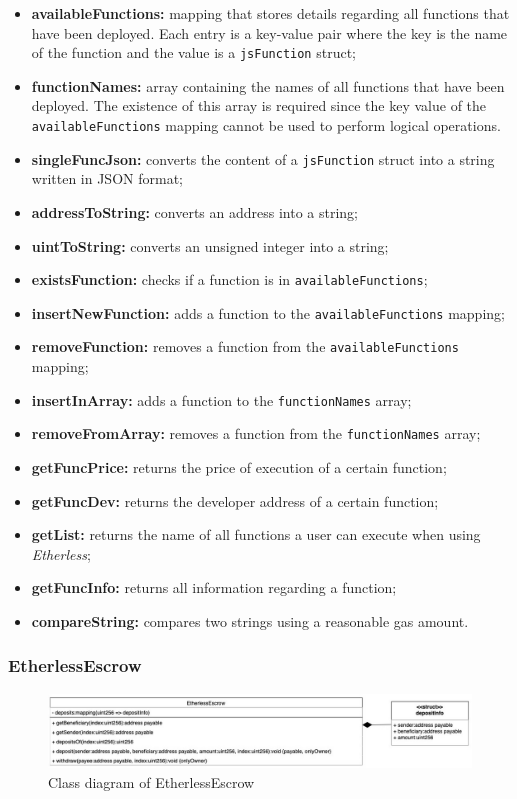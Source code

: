 	\begin{itemize}
		\item \textbf{availableFunctions:} mapping that stores details regarding all functions that have been deployed. Each entry is a key-value pair where the key is the name of the function and the value is a \texttt{jsFunction} struct;
		\item \textbf{functionNames:} array containing the names of all functions that have been deployed. The existence of this array is required since the key value of the \texttt{availableFunctions} mapping cannot be used to perform logical operations.
	\end{itemize}
	\begin{itemize}
		\item \textbf{singleFuncJson:} converts the content of a \texttt{jsFunction} struct into a string written in JSON format;
		\item \textbf{addressToString:} converts an address into a string;
		\item \textbf{uintToString:} converts an unsigned integer into a string;
		\item \textbf{existsFunction:} checks if a function is in \texttt{availableFunctions};
		\item \textbf{insertNewFunction:} adds a function to the \texttt{availableFunctions} mapping;
		\item \textbf{removeFunction:} removes a function from the \texttt{availableFunctions} mapping;
		\item \textbf{insertInArray:} adds a function to the \texttt{functionNames} array;
		\item \textbf{removeFromArray:} removes a function from the \texttt{functionNames} array;
		\item \textbf{getFuncPrice:} returns the price of execution of a certain function;
		\item \textbf{getFuncDev:} returns the developer address of a certain function;
		\item \textbf{getList:} returns the name of all functions a user can execute when using \textit{Etherless};
		\item \textbf{getFuncInfo:} returns all information regarding a function;
		\item \textbf{compareString:} compares two strings using a reasonable gas amount.
	\end{itemize}
		
\subsubsection{EtherlessEscrow}
	\begin{figure}[H]
		\centering
		\includegraphics[width=1\linewidth]{diagrammi/etherless-smart/EtherlessEscrow.jpg}
		\caption{Class diagram of EtherlessEscrow}
	\end{figure}

